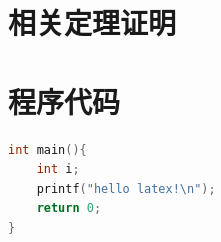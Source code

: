 \begin{appendices}
\section{相关定理证明}

\section{程序代码}


\begin{lstlisting}[language=C++]
int main(){
    int i;
    printf("hello latex!\n");
    return 0;
}
\end{lstlisting}







\end{appendices}
